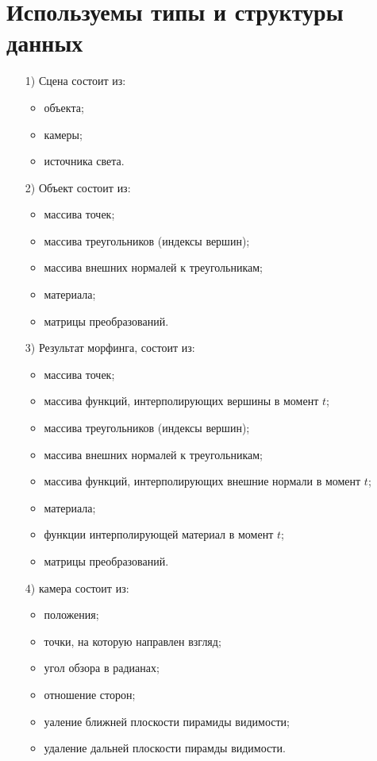 \section{Используемы типы и структуры данных}
\begin{enumerate}
    \item[1)] Сцена состоит из:
    \begin{itemize}
        \item объекта;
        \item камеры;
        \item источника света.
    \end{itemize}

    \item[2)] Объект состоит из:
    \begin{itemize}
        \item массива точек;
        \item массива треугольников (индексы вершин);
        \item массива внешних нормалей к треугольникам;
        \item материала;
        \item матрицы преобразований.
    \end{itemize}

    \item[3)] Результат морфинга, состоит из:
    \begin{itemize}
        \item массива точек;
        \item массива функций, интерполирующих вершины в момент $t$;
        \item массива треугольников (индексы вершин);
        \item массива внешних нормалей к треугольникам;
        \item массива функций, интерполирующих внешние нормали в момент $t$;
        \item материала;
        \item функции интерполирующей материал в момент $t$;
        \item матрицы преобразований.
    \end{itemize}

    \item[4)] камера состоит из:
    \begin{itemize}
        \item положения;
        \item точки, на которую направлен взгляд;
        \item угол обзора в радианах;
        \item отношение сторон;
        \item уаление ближней плоскости пирамиды видимости;
        \item удаление дальней плоскости пирамды видимости.
    \end{itemize}


\end{enumerate}
